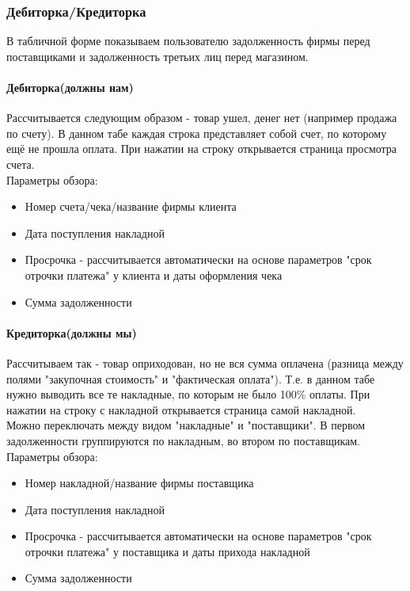 \documentclass[DIV=calc, paper=a4, fontsize=11pt]{scrartcl} %
\begin{document}
\subsubsection{Дебиторка/Кредиторка}

В табличной форме показываем пользователю задолженность фирмы перед поставщиками и задолженность третьих лиц перед магазином.

\paragraph{Дебиторка(должны нам)}
Рассчитывается следующим образом - товар ушел, денег нет (например продажа по счету). В данном табе каждая строка представляет собой счет, по которому ещё не прошла оплата. При нажатии на строку открывается страница просмотра счета.
\\[0.5cm]
Параметры обзора:

\begin{itemize}
	\item Номер счета/чека/название фирмы клиента
	\item Дата поступления накладной
	\item Просрочка - рассчитывается автоматически на основе параметров "срок отрочки платежа" у клиента и даты оформления чека
	\item Сумма задолженности
\end{itemize}

\paragraph{Кредиторка(должны мы)}
Рассчитываем так - товар оприходован, но не вся сумма оплачена (разница между полями "закупочная стоимость" и "фактическая оплата"). Т.е. в данном табе нужно выводить все те накладные, по которым не было 100\% оплаты. При нажатии на строку с накладной открывается страница самой накладной.
\\[0.5cm]
Можно переключать между видом "накладные" и "поставщики". В первом задолженности группируются по накладным, во втором по поставщикам. 
\\[0.5cm]
Параметры обзора:

\begin{itemize}
	\item Номер накладной/название фирмы поставщика
	\item Дата поступления накладной
	\item Просрочка - рассчитывается автоматически на основе параметров "срок отрочки платежа" у поставщика и даты прихода накладной
	\item Сумма задолженности
\end{itemize}
\end{document}
